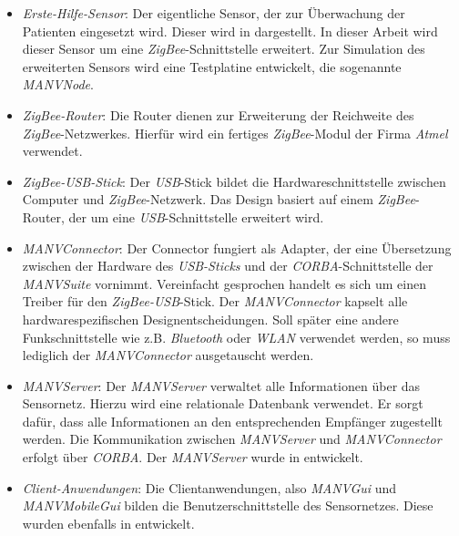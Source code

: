 \begin{itemize}
    \item{\emph{Erste-Hilfe-Sensor}:} Der eigentliche Sensor, der zur Überwachung der Patienten eingesetzt wird. Dieser 
                               wird in \cite{Marc} dargestellt. In dieser Arbeit wird dieser Sensor um eine 
                               \emph{ZigBee}-Schnittstelle erweitert. Zur Simulation des erweiterten Sensors
                               wird eine Testplatine entwickelt, die sogenannte \emph{MANVNode}.
    \item{\emph{ZigBee-Router}:} Die Router dienen zur Erweiterung der Reichweite des \emph{ZigBee}-Netzwerkes.
                                 Hierfür wird ein fertiges \emph{ZigBee}-Modul der Firma \emph{Atmel} verwendet.
    \item{\emph{ZigBee-USB-Stick}:} Der \emph{USB}-Stick bildet die Hardwareschnittstelle zwischen Computer und 
                                    \emph{ZigBee}-Netzwerk. Das Design basiert auf einem \emph{ZigBee}-Router,
                                    der um eine \emph{USB}-Schnittstelle erweitert wird.
    \item{\emph{MANVConnector}:} Der Connector fungiert als Adapter, der eine Übersetzung zwischen der 
                                 Hardware des \emph{USB-Sticks} und der \emph{CORBA}-Schnittstelle der \emph{MANV\-Suite}
                                 vornimmt. Vereinfacht gesprochen handelt es sich um einen Treiber für den 
                                 \emph{ZigBee-USB}-Stick. Der \emph{MANVConnector} kapselt alle hardwarespezifischen
                                 Designentscheidungen. Soll später eine andere Funkschnittstelle wie z.B.
                                 \emph{Bluetooth} oder \emph{WLAN} verwendet werden, so muss lediglich
                                 der \emph{MANVConnector} ausgetauscht werden.
    \item{\emph{MANVServer}:} Der \emph{MANVServer} verwaltet alle Informationen über das Sensornetz. Hierzu
                              wird eine relationale Datenbank verwendet. Er sorgt dafür, dass alle Informationen
                              an den entsprechenden Empfänger zugestellt werden. Die Kommunikation zwischen
                              \emph{MANVServer} und \emph{MANVConnector} erfolgt über \emph{CORBA}. Der 
                              \emph{MANVServer} wurde in \cite{Jan} entwickelt.
    \item{\emph{Client-Anwendungen}:} Die Clientanwendungen, also \emph{MANVGui} und \emph{MANVMobileGui} bilden
                                      die Benutzerschnittstelle des Sensornetzes. Diese wurden ebenfalls
                                      in \cite{Jan} entwickelt. 
\end{itemize}
    

